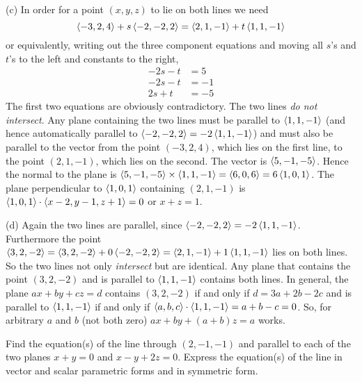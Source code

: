 \begin{solution}
(c) In order for a point $(x,y,z)$ to lie on both lines we need
\begin{equation*}
\left< -3,2,4\right>+s\left< -2,-2,2\right> = \left< 2,1,-1\right>+t\left< 1,1,-1\right>
\end{equation*}
or equivalently, writing out the three component equations and moving
all $s$'s and $t$'s to the left and constants to the right,
\begin{align*}
-2s -t &= 5\\
-2s -t &= -1\\
2s +t &= -5
\end{align*}
The first two equations are obviously contradictory. The
two lines \emph{do not intersect}. Any plane containing the two lines 
must be parallel to $\left< 1,1,-1\right>$ (and hence automatically parallel
to $\left< -2,-2,2\right>=-2\left< 1,1,-1\right>$) and must also be parallel to the vector
from the point $(-3,2,4)$, which lies on the first line, to the point
$(2,1,-1)$, which lies on the second. The vector is $\left< 5,-1,-5\right>$. 
Hence the normal to the plane is 
$\left< 5,-1,-5\right>\times\left< 1,1,-1\right>=\left< 6,0,6\right>=6\left< 1,0,1\right>$.
The plane perpendicular to $\left< 1,0,1\right>$ containing $(2,1,-1)$ is
$\left< 1,0,1\right>\cdot\left< x-2,y-1,z+1\right>=0$ or $x+z=1$.

(d) Again the two lines are parallel, since 
$\left< -2,-2,2\right>=-2\left< 1,1,-1\right>$.
Furthermore the point 
$\left< 3,2,-2\right>=\left< 3,2,-2\right>+0\left< -2,-2,2\right>
       =\left< 2,1,-1\right>+1\left< 1,1,-1\right>$
lies on both lines. So the two lines not only \emph{intersect} but
are identical. Any plane that contains the point $(3,2,-2)$ and is parallel
to $\left< 1,1,-1\right>$ contains both lines. In general, the plane $ax+by+cz=d$
contains $(3,2,-2)$ if and only if $d=3a+2b-2c$ and is parallel to 
$\left< 1,1,-1\right>$ if and only if $\left< a,b,c\right>\cdot\left< 1,1,-1\right>=a+b-c=0$. So, for arbitrary $a$ and $b$ (not both zero) $ax+by+(a+b)z=a$ works.
\end{solution}




\begin{question}
Find the equation(s) of the line through $(2,-1,-1)$ and parallel
to each of the two planes $x+y=0$ and $x-y+2z=0$. Express the equation(s)
of the line in vector and scalar parametric forms and in symmetric form.
\end{question}

%

